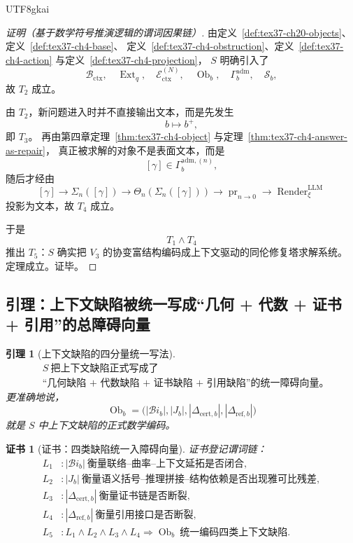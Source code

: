 \documentclass[12pt]{article}
\newtheorem{lemma}{引理}[section]
\newtheorem{Certificate}{证书}[section]
\newcommand{\Render}{\operatorname{Render}}
\begin{document}
\begin{CJK*}{UTF8}{gkai}
\begin{proof}[证明（基于数学符号推演逻辑的谓词因果链）]
由定义~\ref{def:tex37-ch20-objects}、定义~\ref{def:tex37-ch4-base}、
定义~\ref{def:tex37-ch4-obstruction}、定义~\ref{def:tex37-ch4-action} 与定义~\ref{def:tex37-ch4-projection}，
$S$ 明确引入了
\[
  \mathcal B_{\mathrm{ctx}},
  \quad
  \operatorname{Ext}_q,
  \quad
  \mathcal E_{\mathrm{ctx}}^{(N)},
  \quad
  \operatorname{Ob}_b,
  \quad
  \Gamma_b^{\mathrm{adm}},
  \quad
  \mathcal S_b,
\]
故 $T_2$ 成立。

由 $T_2$，新问题进入时并不直接输出文本，而是先发生
\[
  b\mapsto b^+,
\]
即 $T_3$。
再由第四章定理~\ref{thm:tex37-ch4-object} 与定理~\ref{thm:tex37-ch4-answer-as-repair}，
真正被求解的对象不是表面文本，而是
\[
  [\gamma]\in \Gamma_b^{\mathrm{adm},(n)},
\]
随后才经由
\[
  [\gamma]
  \to
  \Sigma_n([\gamma])
  \to
  \Theta_n(\Sigma_n([\gamma]))
  \to
  \operatorname{pr}_{n\to 0}
  \to
  \Render^{\mathrm{LLM}}_\xi
\]
投影为文本，故 $T_4$ 成立。

于是
\[
  T_1\wedge T_4
\]
推出 $T_5$：$S$ 确实把 $V_3$ 的协变富结构编码成上下文驱动的同伦修复塔求解系统。
定理成立。证毕。
\end{proof}

\subsection{引理：上下文缺陷被统一写成“几何 + 代数 + 证书 + 引用”的总障碍向量}
\label{subsec:tex37-ch20-lemma-obstruction}

\begin{lemma}[上下文缺陷的四分量统一写法]
\label{lem:tex37-ch20-obstruction}
\[
  \boxed{
    \begin{aligned}
      &S\ \text{把上下文缺陷正式写成了}\\
      &\text{“几何缺陷 + 代数缺陷 + 证书缺陷 + 引用缺陷”的统一障碍向量。}
    \end{aligned}
  }
\]
更准确地说，
\[
  \operatorname{Ob}_b
  =
  \bigl(
    |\mathcal{B}\!i_b|,
    |J_b|,
    |\Delta_{\mathrm{cert},b}|,
    |\Delta_{\mathrm{ref},b}|
  \bigr)
\]
就是 $S$ 中上下文缺陷的正式数学编码。
\end{lemma}

\begin{Certificate}[证书：四类缺陷统一入障碍向量]
\label{cert:tex37-ch20-obstruction}
证书登记谓词链：
\[
\begin{aligned}
  L_1 &: |\mathcal{B}\!i_b|\ \text{衡量联络--曲率--上下文延拓是否闭合},\\
  L_2 &: |J_b|\ \text{衡量语义括号--推理拼接--结构依赖是否出现雅可比残差},\\
  L_3 &: |\Delta_{\mathrm{cert},b}|\ \text{衡量证书链是否断裂},\\
  L_4 &: |\Delta_{\mathrm{ref},b}|\ \text{衡量引用接口是否断裂},\\
  L_5 &: L_1\wedge L_2\wedge L_3\wedge L_4\Rightarrow \operatorname{Ob}_b\ \text{统一编码四类上下文缺陷}.
\end{aligned}
\]
\end{Certificate}


\end{CJK*}
\end{document}
